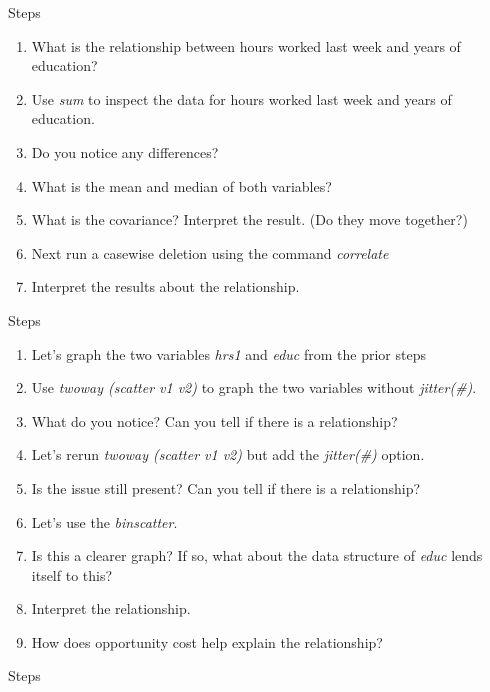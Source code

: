 \documentclass[
]{book}
\providecommand{\tightlist}{%
  \setlength{\itemsep}{0pt}\setlength{\parskip}{0pt}}
\begin{document}
Steps

\begin{enumerate}
\def\labelenumi{\arabic{enumi}.}
\tightlist
\item
  What is the relationship between hours worked last week and years of education?
\item
  Use \emph{sum} to inspect the data for hours worked last week and years of education.
\item
  Do you notice any differences?
\item
  What is the mean and median of both variables?
\item
  What is the covariance? Interpret the result. (Do they move together?)
\item
  Next run a casewise deletion using the command \emph{correlate}
\item
  Interpret the results about the relationship.
\end{enumerate}

Steps

\begin{enumerate}
\def\labelenumi{\arabic{enumi}.}
\tightlist
\item
  Let's graph the two variables \emph{hrs1} and \emph{educ} from the prior steps
\item
  Use \emph{twoway (scatter v1 v2)} to graph the two variables without \emph{jitter(\#)}.
\item
  What do you notice? Can you tell if there is a relationship?
\item
  Let's rerun \emph{twoway (scatter v1 v2)} but add the \emph{jitter(\#)} option.
\item
  Is the issue still present? Can you tell if there is a relationship?
\item
  Let's use the \emph{binscatter}.
\item
  Is this a clearer graph? If so, what about the data structure of \emph{educ} lends itself to this?
\item
  Interpret the relationship.
\item
  How does opportunity cost help explain the relationship?
\end{enumerate}

Steps
\end{document}
